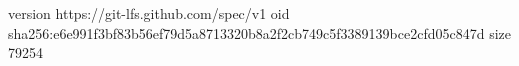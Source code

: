 version https://git-lfs.github.com/spec/v1
oid sha256:e6e991f3bf83b56ef79d5a8713320b8a2f2cb749c5f3389139bce2cfd05c847d
size 79254
